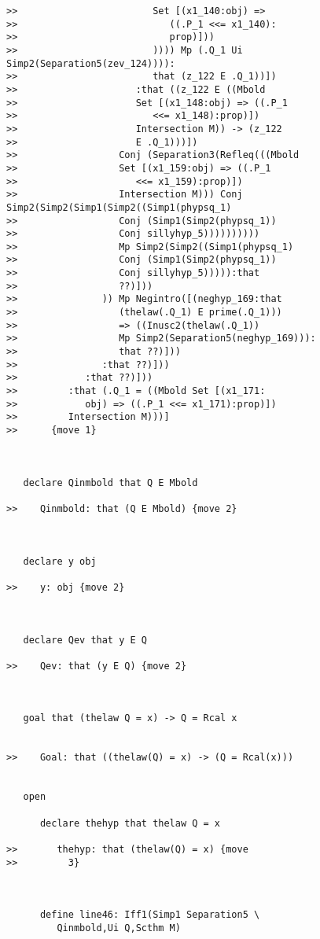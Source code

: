 \documentclass[12pt]{article}
\begin{document}
\begin{verbatim}
>>                        Set [(x1_140:obj) =>
>>                           ((.P_1 <<= x1_140):
>>                           prop)]))
>>                        )))) Mp (.Q_1 Ui Simp2(Separation5(zev_124)))):
>>                        that (z_122 E .Q_1))])
>>                     :that ((z_122 E ((Mbold
>>                     Set [(x1_148:obj) => ((.P_1
>>                        <<= x1_148):prop)])
>>                     Intersection M)) -> (z_122
>>                     E .Q_1)))])
>>                  Conj (Separation3(Refleq(((Mbold
>>                  Set [(x1_159:obj) => ((.P_1
>>                     <<= x1_159):prop)])
>>                  Intersection M))) Conj Simp2(Simp2(Simp1(Simp2((Simp1(phypsq_1)
>>                  Conj (Simp1(Simp2(phypsq_1))
>>                  Conj sillyhyp_5))))))))))
>>                  Mp Simp2(Simp2((Simp1(phypsq_1)
>>                  Conj (Simp1(Simp2(phypsq_1))
>>                  Conj sillyhyp_5))))):that
>>                  ??)]))
>>               )) Mp Negintro([(neghyp_169:that
>>                  (thelaw(.Q_1) E prime(.Q_1)))
>>                  => ((Inusc2(thelaw(.Q_1))
>>                  Mp Simp2(Separation5(neghyp_169))):
>>                  that ??)]))
>>               :that ??)]))
>>            :that ??)]))
>>         :that (.Q_1 = ((Mbold Set [(x1_171:
>>            obj) => ((.P_1 <<= x1_171):prop)])
>>         Intersection M)))]
>>      {move 1}



   declare Qinmbold that Q E Mbold

>>    Qinmbold: that (Q E Mbold) {move 2}



   declare y obj

>>    y: obj {move 2}



   declare Qev that y E Q

>>    Qev: that (y E Q) {move 2}



   goal that (thelaw Q = x) -> Q = Rcal x


>>    Goal: that ((thelaw(Q) = x) -> (Q = Rcal(x)))


   open

      declare thehyp that thelaw Q = x

>>       thehyp: that (thelaw(Q) = x) {move
>>         3}



      define line46: Iff1(Simp1 Separation5 \
         Qinmbold,Ui Q,Scthm M)


\end{verbatim}
\end{document}
